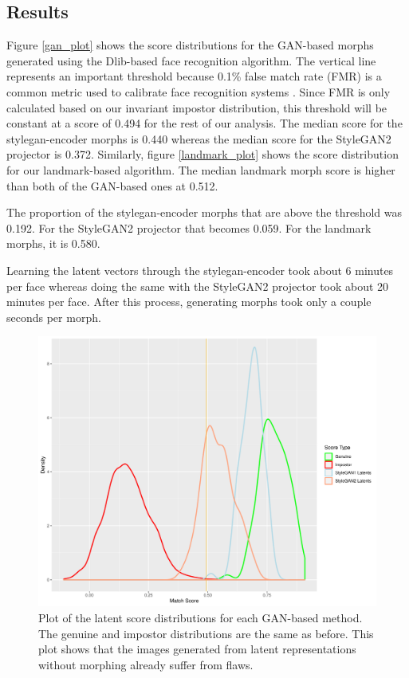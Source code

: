 \documentclass[12pt,twocolumn]{paper}
\begin{document}
\subsection{Results}
\par
Figure \ref{gan_plot} shows the score distributions for the GAN-based morphs generated using the Dlib-based face recognition algorithm. The vertical line represents an important threshold because 0.1\% false match rate (FMR) is a common metric used to calibrate face recognition systems \cite{frontex2015best}. Since FMR is only calculated based on our invariant impostor distribution, this threshold will be constant at a score of 0.494 for the rest of our analysis. The median score for the stylegan-encoder morphs is 0.440 whereas the median score for the StyleGAN2 projector is 0.372. Similarly, figure \ref{landmark_plot} shows the score distribution for our landmark-based algorithm. The median landmark morph score is higher than both of the GAN-based ones at 0.512.
\par
The proportion of the stylegan-encoder morphs that are above the threshold was 0.192. For the StyleGAN2 projector that becomes 0.059. For the landmark morphs, it is 0.580.
\par
Learning the latent vectors through the stylegan-encoder took about 6 minutes per face whereas doing the same with the StyleGAN2 projector took about 20 minutes per face. After this process, generating morphs took only a couple seconds per morph.

\begin{figure}[t]
    \centering
    \includegraphics[width=0.9\linewidth]{dlib_fr_latent_hist.pdf}
    \caption{Plot of the latent score distributions for each GAN-based method. The genuine and impostor distributions are the same as before. This plot shows that the images generated from latent representations without morphing already suffer from flaws.}
    \label{latent_plot}
\end{figure}
\end{document}
